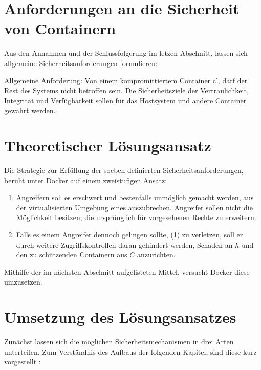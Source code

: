 \documentclass[../main.tex]{subfiles}
\begin{document}

  \section{Anforderungen an die Sicherheit von Containern}
    Aus den Annahmen und der Schlussfolgerung im letzen Abschnitt, lassen sich allgemeine Sicherheitsanforderungen formulieren:

    Allgemeine Anforderung: Von einem kompromittiertem Container c', darf der Rest des Systems nicht betroffen sein. Die Sicherheitsziele der Vertraulichkeit, Integrität und Verfügbarkeit sollen für das Hostsystem und andere Container gewahrt werden.

  \section{Theoretischer Lösungsansatz}
    Die Strategie zur Erfüllung der soeben definierten Sicherheitsanforderungen, beruht unter Docker auf einem zweistufigen Ansatz:

    \begin{enumerate}[label=(\arabic*)]
      \item Angreifern soll es erschwert und bestenfalls unmöglich gemacht werden, aus der virtualisierten Umgebung eines \cbroken{} auszubrechen. Angreifer sollen nicht die Möglichkeit besitzen, die ursprünglich für \cbroken{} vorgesehenen Rechte zu erweitern.
      \item Falls es einem Angreifer dennoch gelingen sollte, (1) zu verletzen, soll er durch weitere Zugriffskontrollen daran gehindert werden, Schaden an \(h\) und den zu schützenden Containern aus \(C\) anzurichten.
    \end{enumerate}

    Mithilfe der im nächsten Abschnitt aufgelisteten Mittel, versucht Docker diese umzusetzen.


  \section{Umsetzung des Lösungsansatzes} %
  \label{questionRealization}
    Zunächst lassen sich die möglichen Sicherheitsmechanismen in drei Arten unterteilen. Zum Verständnis des Aufbaus der folgenden Kapitel, sind diese kurz vorgestellt \cite[S.40]{CISSP}:
\end{document}
